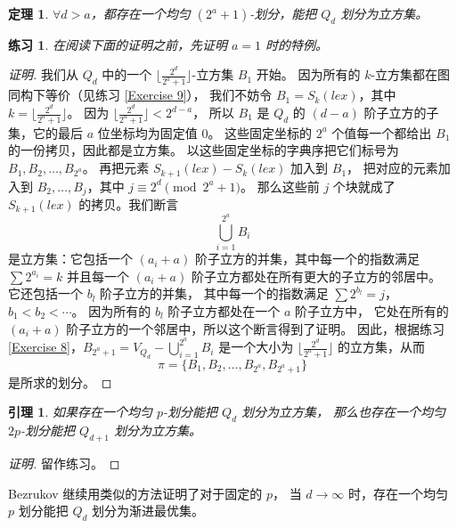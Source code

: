 \documentclass[12pt, a4paper]{article}
\newtheorem{theorem}{定理}
\newtheorem{lemma}{引理}
\newtheorem{exercise}{练习}
\begin{document}
\begin{theorem}
\label{Theorem 3}
$\forall d > a$，都存在一个均匀 $(2^a + 1)$-划分，能把 $Q_d$ 划分为立方集。
\end{theorem}

\begin{exercise}
\label{Exercise 15}
在阅读下面的证明之前，先证明 $a = 1$ 时的特例。
\end{exercise}

\begin{proof}[证明]
我们从 $Q_d$ 中的一个 $\lfloor\frac{2^d}{2^a + 1}\rfloor$-立方集 $B_1$ 开始。
因为所有的 $k$-立方集都在图同构下等价（见练习 \ref{Exercise 9}），
我们不妨令 $B_1 = S_k(lex)$，其中 $k = \lfloor\frac{2^d}{2^a + 1}\rfloor$。
因为 $\lfloor\frac{2^d}{2^a + 1}\rfloor < 2^{d - a}$，
所以 $B_1$ 是 $Q_d$ 的 $(d - a)$ 阶子立方的子集，它的最后 $a$ 位坐标均为固定值 $0$。
这些固定坐标的 $2^a$ 个值每一个都给出 $B_1$ 的一份拷贝，因此都是立方集。
以这些固定坐标的字典序把它们标号为 $B_1, B_2, \dots, B_{2^a}$。
再把元素 $S_{k + 1}(lex) - S_k(lex)$ 加入到 $B_1$，
把对应的元素加入到 $B_2, \dots, B_j$，其中 $j \equiv 2^d \pmod{2^a + 1}$。
那么这些前 $j$ 个块就成了 $S_{k + 1}(lex)$ 的拷贝。我们断言
\begin{equation*}
\bigcup_{i = 1}^{2^a} B_i
\end{equation*}
是立方集：它包括一个 $(a_i + a)$ 阶子立方的并集，其中每一个的指数满足 $\sum 2^{a_i} = k$
并且每一个 $(a_i + a)$ 阶子立方都处在所有更大的子立方的邻居中。
它还包括一个 $b_l$ 阶子立方的并集，
其中每一个的指数满足 $\sum 2^{b_l} = j$，$b_1 < b_2 < \cdots$。
因为所有的 $b_l$ 阶子立方都处在一个 $a$ 阶子立方中，
它处在所有的 $(a_i + a)$ 阶子立方的一个邻居中，所以这个断言得到了证明。
因此，根据练习 \ref{Exercise 8}，$B_{2^a + 1} = V_{Q_d} - \bigcup_{i = 1}^{2^a} B_i$
是一个大小为 $\lfloor\frac{2^d}{2^a + 1}\rfloor$ 的立方集，从而
\begin{equation*}
\pi = \{B_1, B_2, \dots, B_{2^a}, B_{2^a + 1}\}
\end{equation*}
是所求的划分。
\end{proof}

\begin{lemma}
\label{Lemma 6}
如果存在一个均匀 $p$-划分能把 $Q_d$ 划分为立方集，
那么也存在一个均匀 $2 p$-划分能把 $Q_{d + 1}$ 划分为立方集。
\end{lemma}

\begin{proof}[证明]
留作练习。
\end{proof}

Bezrukov \cite{Bezrukov.1997} 继续用类似的方法证明了对于固定的 $p$，
当 $d \rightarrow \infty$ 时，存在一个均匀 $p$ 划分能把 $Q_d$ 划分为渐进最优集。
\end{document}
